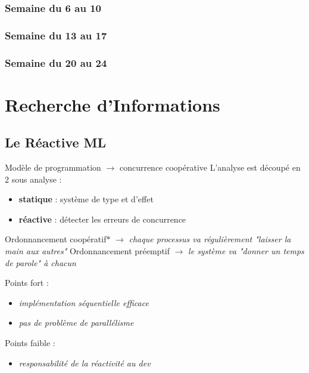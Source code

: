 \documentclass[10pt,a4paper]{article}
\begin{document}
		\subsubsection{Semaine du 6 au 10}
		
		\subsubsection{Semaine du 13 au 17}
		
		\subsubsection{Semaine du 20 au 24}
	\newpage
	
	\section{Recherche d'Informations}\label{Recherche}
		\subsection{Le Réactive ML}
				Modèle de programmation $\longrightarrow$ concurrence coopérative 
				\smallbreak
				L'analyse est découpé en 2 sous analyse :
				\begin{itemize}
					\item \textbf{statique} : système de type et d'effet
					\item \textbf{réactive} : détecter les erreurs de concurrence
				\end{itemize}
				\bigbreak
			
			
				Ordonnancement coopératif$\ast$ $\longrightarrow$ \textit{\small{chaque processus va r\'{e}guli\`{e}rement "laisser la main aux autres"}}
				\smallbreak
				Ordonnancement pr\'{e}emptif $\longrightarrow$ \textit{\small{le syst\`{e}me va "donner un temps de parole" \`{a} chacun}}
				\medbreak
				
				Points fort :
				\begin{itemize}
					\item \textit{\small{impl\'{e}mentation s\'{e}quentielle efficace}}
					\item \textit{\small{pas de probl\`{e}me de parall\'{e}lisme}}
				\end{itemize}
				\medbreak
				
				Points faible : 
				\begin{itemize}
					\item \textit{\small{responsabilit\'{e} de la r\'{e}activit\'{e} au dev}}
				\end{itemize}
				\medbreak
				
\end{document}
